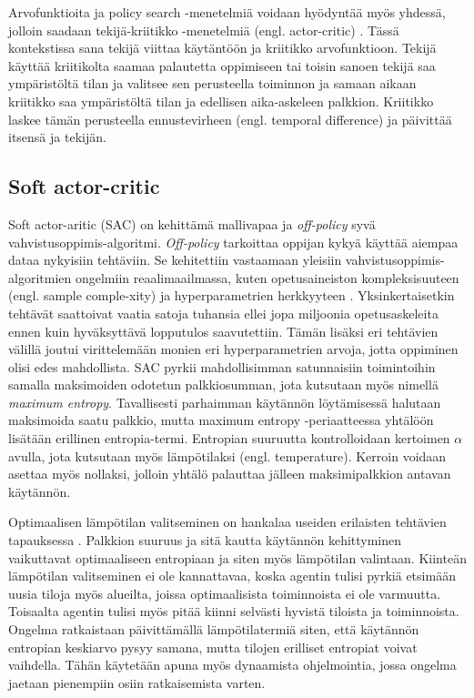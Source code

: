 \documentclass[utf8]{gradu3}
\begin{document}
Arvofunktioita ja policy search -menetelmiä voidaan hyödyntää myös yhdessä, jolloin saadaan tekijä-kriitikko -menetelmiä (engl. actor-critic) \parencite{arulkumaran2017brief}. Tässä kontekstissa sana tekijä viittaa käytäntöön ja kriitikko arvofunktioon. Tekijä käyttää kriitikolta saamaa palautetta oppimiseen tai toisin sanoen tekijä saa ympäristöltä tilan ja valitsee sen perusteella toiminnon ja samaan aikaan kriitikko saa ympäristöltä tilan ja edellisen aika-askeleen palkkion. Kriitikko laskee tämän perusteella ennustevirheen (engl. temporal difference) ja päivittää itsensä ja tekijän.

\subsection{Soft actor-critic}

Soft actor-aritic (SAC) on \textcite{haarnoja2018soft} kehittämä mallivapaa ja \textit{off-policy} syvä vahvistusoppimis-algoritmi. \textit{Off-policy} tarkoittaa oppijan kykyä käyttää aiempaa dataa nykyisiin tehtäviin. Se kehitettiin vastaamaan yleisiin vahvistusoppimis-algoritmien ongelmiin reaalimaailmassa, kuten opetusaineiston kompleksisuuteen (engl. sample comple-xity) ja hyperparametrien herkkyyteen \parencite{haarnoja2018app}. Yksinkertaisetkin tehtävät saattoivat vaatia satoja tuhansia ellei jopa miljoonia opetusaskeleita ennen kuin hyväksyttävä lopputulos saavutettiin. Tämän lisäksi eri tehtävien välillä joutui virittelemään monien eri hyperparametrien arvoja, jotta oppiminen olisi edes mahdollista. SAC pyrkii mahdollisimman satunnaisiin toimintoihin samalla maksimoiden odotetun palkkiosumman, jota kutsutaan myös nimellä \textit{maximum entropy}. Tavallisesti parhaimman käytännön löytämisessä halutaan maksimoida saatu palkkio, mutta maximum entropy -periaatteessa yhtälöön lisätään erillinen entropia-termi. Entropian suuruutta kontrolloidaan kertoimen $\alpha$ avulla, jota kutsutaan myös lämpötilaksi (engl. temperature). Kerroin voidaan asettaa myös nollaksi, jolloin yhtälö palauttaa jälleen maksimipalkkion antavan käytännön.

Optimaalisen lämpötilan valitseminen on hankalaa useiden erilaisten tehtävien tapauksessa \parencite{haarnoja2018app}. Palkkion suuruus ja sitä kautta käytännön kehittyminen vaikuttavat optimaaliseen entropiaan ja siten myös lämpötilan valintaan. Kiinteän lämpötilan valitseminen ei ole kannattavaa, koska agentin tulisi pyrkiä etsimään uusia tiloja myös alueilta, joissa optimaalisista toiminnoista ei ole varmuutta. Toisaalta agentin tulisi myös pitää kiinni selvästi hyvistä tiloista ja toiminnoista. Ongelma ratkaistaan päivittämällä lämpötilatermiä siten, että käytännön entropian keskiarvo pysyy samana, mutta tilojen erilliset entropiat voivat vaihdella. Tähän käytetään apuna myös dynaamista ohjelmointia, jossa ongelma jaetaan pienempiin osiin ratkaisemista varten.
\end{document}
